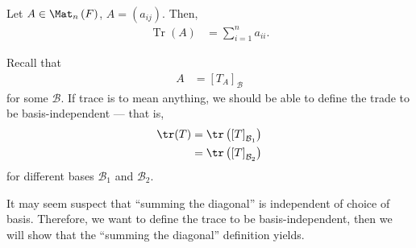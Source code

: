 \documentclass[10pt]{mypackage}
\begin{document}
  \begin{definition}[Trace]
    Let $A\in \Mat_{n}\left(F\right)$, $A = \left(a_{ij}\right)$. Then,
    \begin{align*}
      \operatorname{Tr}(A) &= \sum_{i=1}^{n}a_{ii}.
    \end{align*}
  \end{definition}
  Recall that
  \begin{align*}
    A &= \left[T_{A}\right]_{\mathcal{B}}
  \end{align*}
  for some $\mathcal{B}$. If trace is to mean anything, we should be able to define the trade to be basis-independent --- that is,
  \begin{align*}
    \tr(T) &= \tr\left(\left[T\right]_{\mathcal{B}_1}\right)\\
           &= \tr\left(\left[T\right]_{\mathcal{B}_2}\right)
  \end{align*}
  for different bases $\mathcal{B}_1$ and $\mathcal{B}_2$.\newline

  It may seem suspect that ``summing the diagonal'' is independent of choice of basis. Therefore, we want to define the trace to be basis-independent, then we will show that the ``summing the diagonal'' definition yields.\newline
\end{document}
